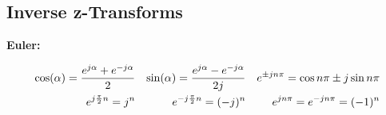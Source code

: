 \subsection{Inverse z-Transforms}

\textbf{Euler:}

\begin{align}
\cos(\alpha) = \frac{e^{j\alpha} + e^{-j\alpha}}{2}
&& \sin(\alpha) = \frac{e^{j\alpha} - e^{-j\alpha}}{2j} && 
    {e}^{\pm jn\pi} = \cos{n\pi} \pm j \sin{n\pi} \notag\\
e^{j\frac{\pi}{2}n} = j^n & & e^{-j\frac{\pi}{2}n} = (-j)^n &&
e^{jn\pi}=e^{-jn\pi}=(-1)^n \notag
\end{align}
